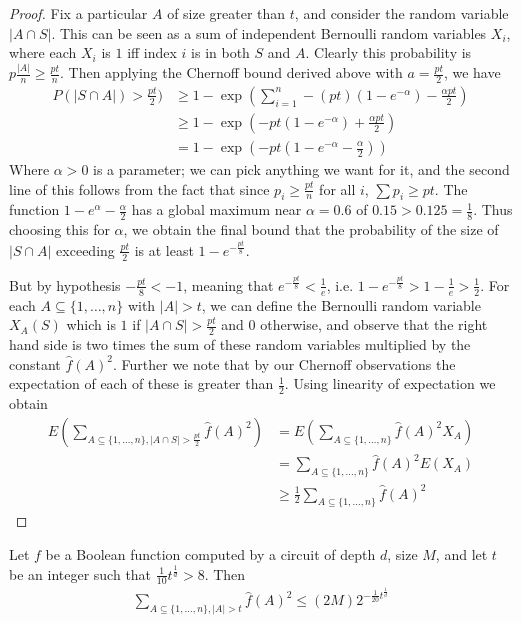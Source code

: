 \begin{proof}
	Fix a particular $A$ of size greater than $t$, and consider the random variable $|A \cap S|$. This can be seen as a sum of independent Bernoulli random variables $X_i$, where each $X_i$ is $1$ iff index $i$ is in both $S$ and $A$. Clearly this probability is $p\frac{|A|}{n} \geq \frac{pt}{n}$. Then applying the Chernoff bound derived above with $a = \frac{pt}{2}$, we have
\begin{align*}
	P(|S \cap A|) > \frac{pt}{2}) &\geq 1-\exp\left( \sum_{i=1}^n-(pt)(1-e^{-\alpha})-\frac{\alpha pt}{2}  \right) \\
		&\geq 1-\exp\left(-pt(1-e^{-\alpha}) + \frac{\alpha pt}{2} \right) \\
		&= 1-\exp\left( -pt(1-e^{-\alpha}-\frac{\alpha}{2}) \right)
\end{align*}
	Where $\alpha > 0$ is a parameter; we can pick anything we want for it, and the second line of this follows from the fact that since $p_i \geq \frac{pt}{n}$ for all $i$, $\sum p_i \geq pt$. The function $1-e^{\alpha} - \frac{\alpha}{2}$ has a global maximum near $\alpha = 0.6$ of $0.15 > 0.125 = \frac{1}{8}$. Thus choosing this for $\alpha$, we obtain the final bound that the probability of the size of $|S \cap A|$ exceeding $\frac{pt}{2}$ is at least $1-e^{-\frac{pt}{8}}$. \par  
	But by hypothesis $-\frac{pt}{8} < -1$, meaning that $e^{-\frac{pt}{8}} < \frac{1}{e}$, i.e. $1-e^{-\frac{pt}{8}} > 1-\frac{1}{e} > \frac{1}{2}$. For each $A \subseteq \{1,\ldots,n\}$ with $|A| > t$, we can define the Bernoulli random variable $X_A(S)$ which is $1$ if $|A \cap S| > \frac{pt}{2}$ and $0$ otherwise, and observe that the right hand side is two times the sum of these random variables multiplied by the constant $\hat{f}(A)^2$. Further we note that by our Chernoff observations the expectation of each of these is greater than $\frac{1}{2}$. Using linearity of expectation we obtain 
	\begin{align*}
		E\left( \sum_{A \subseteq \{1,\ldots,n\}, |A \cap S| > \frac{pt}{2}} \hat{f}(A)^2 \right) &= E \left( \sum_{A \subseteq \{1,\ldots,n\}} \hat{f}(A)^2 X_A \right) \\
		&= \sum_{A \subseteq \{1,\ldots,n\}} \hat{f}(A)^2 E(X_A) \\
		&\geq \frac{1}{2}\sum_{A \subseteq \{1,\ldots,n\}} \hat{f}(A)^2
	\end{align*}   
\end{proof}
\begin{theorem}
	Let $f$ be a Boolean function computed by a circuit of depth $d$, size $M$, and let $t$ be an integer such that $\frac{1}{10}t^{\frac{1}{d}} > 8$. Then 
	\begin{align}
		\sum_{A \subseteq \{1,\ldots,n\}, |A| > t} \hat{f}(A)^2 \leq (2M)2^{-\frac{1}{20}t^{\frac{1}{d}}}
	\end{align}
\end{theorem}
